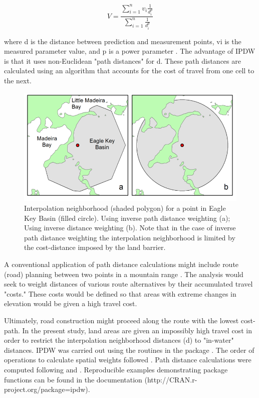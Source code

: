 \documentclass[shortnames,nofooter,noheadings]{jss}
\begin{document}
\begin{equation}
\label{eq:one}
V = \frac{\sum\limits_{i=1}^n v_i \frac{1}{d_i^p}}{\sum\limits_{i=1}^n \frac{1}{d_i^p}}
\end{equation}

where d is the distance between prediction and measurement points, vi is the measured parameter value, and p is a power parameter \citep{isaaks1989applied}. The advantage of IPDW is that it uses non-Euclidean "path distances" for d. These path distances are calculated using an algorithm that accounts for the cost of travel from one cell to the next.

\vspace{20pt}
\begin{figure}[h]
\begin{center}
\includegraphics{sm-figure1.png}
\end{center}
\vspace{-20pt}
\caption{Interpolation neighborhood (shaded polygon) for a point in Eagle Key Basin (filled circle). Using inverse path distance weighting (a); Using inverse distance weighting (b). Note that in the case of inverse path distance weighting the interpolation neighborhood is limited by the cost-distance imposed by the land barrier.}
\label{fig:two}
\end{figure}
\FloatBarrier

\noindent A conventional application of path distance calculations might include route (road) planning between two points in a mountain range \citep{collischonn2000direction}. The analysis would seek to weight distances of various route alternatives by their accumulated travel "costs." These costs would be defined so that areas with extreme changes in elevation would be given a high travel cost.

  Ultimately, road construction might proceed along the route with the lowest cost-path. In the present study, land areas are given an impossibly high travel cost in order to restrict the interpolation neighborhood distances (d) to "in-water" distances. 
IPDW was carried out using the routines in the   package \citep{stachelek2014}. The order of operations to calculate spatial weights followed \citet{suominen2010surface}. Path distance calculations were computed following \citet{csardi2006igraph} and \citet{etten2014}. Reproducible examples demonstrating package functions can be found in the  documentation (http://CRAN.r-project.org/package=ipdw). 
\end{document}
